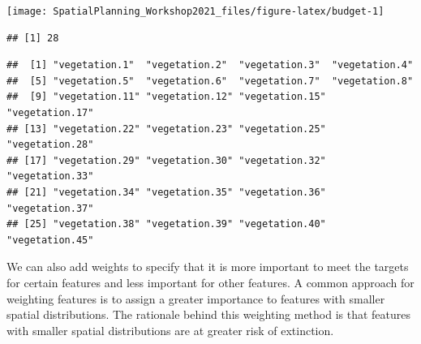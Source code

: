 \documentclass[
  12pt,
]{book}
\newenvironment{Shaded}{\begin{snugshade}}{\end{snugshade}}
\newcommand{\AttributeTok}[1]{\textcolor[rgb]{0.77,0.63,0.00}{#1}}
\newcommand{\CommentTok}[1]{\textcolor[rgb]{0.56,0.35,0.01}{\textit{#1}}}
\newcommand{\ConstantTok}[1]{\textcolor[rgb]{0.00,0.00,0.00}{#1}}
\newcommand{\FloatTok}[1]{\textcolor[rgb]{0.00,0.00,0.81}{#1}}
\newcommand{\FunctionTok}[1]{\textcolor[rgb]{0.00,0.00,0.00}{#1}}
\newcommand{\NormalTok}[1]{#1}
\newcommand{\OtherTok}[1]{\textcolor[rgb]{0.56,0.35,0.01}{#1}}
\newcommand{\SpecialCharTok}[1]{\textcolor[rgb]{0.00,0.00,0.00}{#1}}
\newcommand{\StringTok}[1]{\textcolor[rgb]{0.31,0.60,0.02}{#1}}
\begin{document}
\begin{center}\texttt{[image: SpatialPlanning\_Workshop2021\_files/figure-latex/budget-1]} \end{center}

\begin{Shaded}
\end{Shaded}

\begin{verbatim}
## [1] 28
\end{verbatim}

\begin{Shaded}
\end{Shaded}

\begin{verbatim}
##  [1] "vegetation.1"  "vegetation.2"  "vegetation.3"  "vegetation.4" 
##  [5] "vegetation.5"  "vegetation.6"  "vegetation.7"  "vegetation.8" 
##  [9] "vegetation.11" "vegetation.12" "vegetation.15" "vegetation.17"
## [13] "vegetation.22" "vegetation.23" "vegetation.25" "vegetation.28"
## [17] "vegetation.29" "vegetation.30" "vegetation.32" "vegetation.33"
## [21] "vegetation.34" "vegetation.35" "vegetation.36" "vegetation.37"
## [25] "vegetation.38" "vegetation.39" "vegetation.40" "vegetation.45"
\end{verbatim}

We can also add weights to specify that it is more important to meet the targets for certain features and less important for other features. A common approach for weighting features is to assign a greater importance to features with smaller spatial distributions. The rationale behind this weighting method is that features with smaller spatial distributions are at greater risk of extinction.
\end{document}
